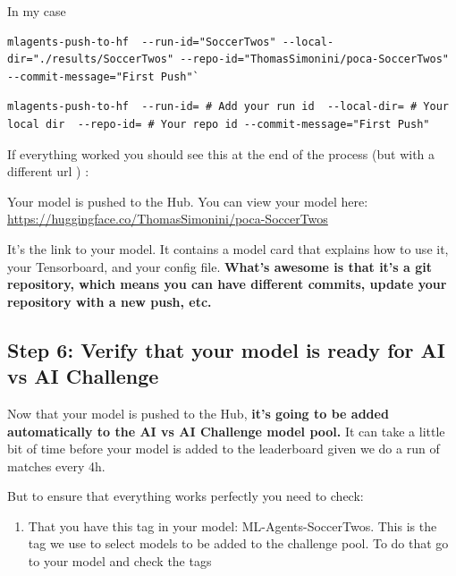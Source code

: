 \documentclass[11pt,a4paper]{article}
\begin{document}
In my case

\begin{lstlisting}
mlagents-push-to-hf  --run-id="SoccerTwos" --local-dir="./results/SoccerTwos" --repo-id="ThomasSimonini/poca-SoccerTwos" --commit-message="First Push"`
\end{lstlisting}

\begin{lstlisting}
mlagents-push-to-hf  --run-id= # Add your run id  --local-dir= # Your local dir  --repo-id= # Your repo id --commit-message="First Push"
\end{lstlisting}

If everything worked you should see this at the end of the process (but with a different url ) :

Your model is pushed to the Hub. You can view your model here: \url{https://huggingface.co/ThomasSimonini/poca-SoccerTwos}

It's the link to your model. It contains a model card that explains how to use it, your Tensorboard, and your config file. \textbf{What's awesome is that it's a git repository, which means you can have different commits, update your repository with a new push, etc.}

\subsection{Step 6: Verify that your model is ready for AI vs AI Challenge}\label{step-6-verify-that-your-model-is-ready-for-ai-vs-ai-challenge}

Now that your model is pushed to the Hub, \textbf{it's going to be added automatically to the AI vs AI Challenge model pool.} It can take a little bit of time before your model is added to the leaderboard given we do a run of matches every 4h.

But to ensure that everything works perfectly you need to check:

\begin{enumerate}
\def\labelenumi{\arabic{enumi}.}
\tightlist
\item
  That you have this tag in your model: ML-Agents-SoccerTwos. This is the tag we use to select models to be added to the challenge pool. To do that go to your model and check the tags
\end{enumerate}

\end{document}
